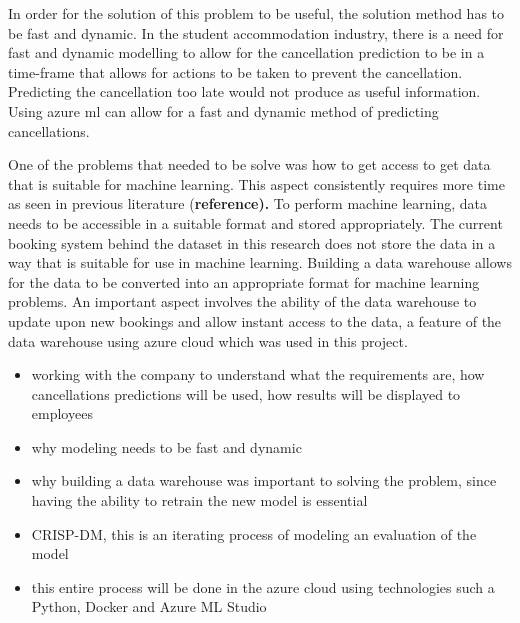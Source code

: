 In order for the solution of this problem to be useful, the solution method has to be fast and dynamic. In the student accommodation industry, there is a need for fast and dynamic modelling to allow for the cancellation prediction to be in a time-frame that allows for actions to be taken to prevent the cancellation. Predicting the cancellation too late would not produce as useful information. Using azure ml can allow for a fast and dynamic method of predicting cancellations. 

One of the problems that needed to be solve was how to get access to get data that is suitable for machine learning. This aspect consistently requires more time as seen in previous literature (\textbf{reference).} To perform machine learning, data needs to be accessible in a suitable format and stored appropriately. The current booking system behind the dataset in this research does not store the data in a way that is suitable for use in machine learning. Building a data warehouse allows for the data to be converted into an appropriate format for machine learning problems. An important aspect involves the ability of the data warehouse to update upon new bookings and allow instant access to the data, a feature of the data warehouse using azure cloud which was used in this project. 



\begin{itemize}
\item working with the company to understand what the requirements are, how cancellations predictions will be used, how results will be displayed to employees
\item why modeling needs to be fast and dynamic 
\item why building a data warehouse was important to solving the problem, since having the ability to retrain the new model is essential 
\item CRISP-DM, this is an iterating process of modeling an evaluation of the model
\item this entire process will be done in the azure cloud using technologies such a Python, Docker and Azure ML Studio 
\end{itemize}
